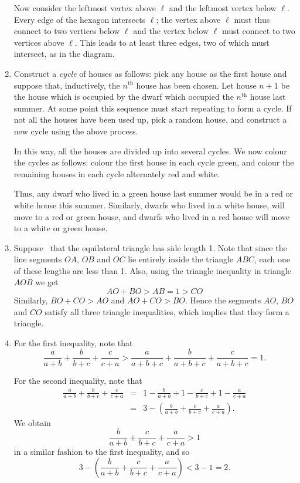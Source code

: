 \documentclass{article}
\begin{document}
\begin{enumerate}
Now consider the leftmost vertex above $\ell$ and the leftmost vertex below $\ell$. Every edge of the hexagon intersects $\ell$; the vertex above $\ell$ must thus connect to two vertices below $\ell$ and the vertex below $\ell$ must connect to two vertices above $\ell$. This leads to at least three edges, two of which must intersect, as in the diagram.

\centerline{}

\item Construct a \emph{cycle} of houses as follows: pick any house as the first house and suppose that, inductively, the $n^{\textrm{th}}$ house has been chosen. Let house $n+1$ be the house which is occupied by the dwarf which occupied the $n^{\textrm{th}}$ house last summer. At some point this sequence must start repeating to form a cycle. If not all the houses have been used up, pick a random house, and construct a new cycle using the above process. 

In this way, all the houses are divided up into several cycles. We now colour the cycles as follows: colour the first house in each cycle green, and colour the remaining houses in each cycle alternately red and white. 

Thus, any dwarf who lived in a green house last summer would be in a red or white house this summer. Similarly, dwarfs who lived in a white house, will move to a red or green house, and dwarfs who lived in a red house will move to a white or green house. 

\item Suppose \wlg\ that the equilateral triangle has side length 1. Note that since the line segments $OA$, $OB$ and $OC$ lie entirely inside the triangle $ABC$, each one of these lengths are less than 1. Also, using the triangle inequality in triangle $AOB$ we get 
$$AO+BO > AB = 1 > CO$$
Similarly, $BO + CO > AO$ and $AO+CO > BO$. Hence the segments $AO$, $BO$ and $CO$ satisfy all three triangle inequalities, which implies that they form a triangle.

\centerline{}

\item For the first inequality, note that 
$$\frac{a}{a+b} + \frac{b}{b+c} + \frac{c}{c+a} > \frac{a}{a+b+c} + \frac{b}{a+b+c}+\frac{c}{a+b+c}=1.$$

For the second inequality, note that 
\begin{eqnarray*}
\frac{a}{a+b} + \frac{b}{b+c} + \frac{c}{c+a} &=& 1-\frac{b}{a+b} + 1-\frac{c}{b+c} + 1-\frac{a}{c+a} \\
&=& 3-\left(\frac{b}{a+b} + \frac{c}{b+c} + \frac{a}{c+a}\right).
\end{eqnarray*}
We obtain 
$$\frac{b}{a+b} + \frac{c}{b+c} + \frac{a}{c+a} > 1$$ in a similar fashion to the first inequality, and so 
$$3-\left(\frac{b}{a+b} + \frac{c}{b+c} + \frac{a}{c+a}\right) < 3-1 = 2.$$

\end{enumerate}
\end{document}
